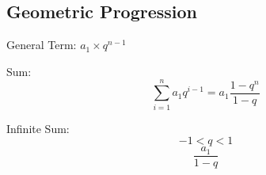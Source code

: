 \subsection{Geometric Progression}

General Term: $ a_{1} \times q^{n - 1} $

Sum:
\[\sum_{i=1}^{n} a_{1} q^{i-1} = a_{1} \frac{1-q^n}{1-q}\]

Infinite Sum:
$$ -1 < q < 1 $$
$$ \dfrac{a_{1}}{1 - q} $$

